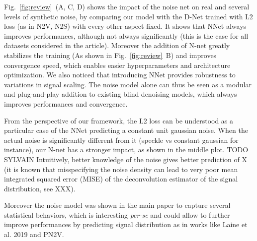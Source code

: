 \documentclass{article}
\begin{document}
Fig.~\ref{fig:review}~(A, C, D) shows the impact of the noise net on real and several levels of synthetic noise, by comparing our model with the D-Net trained with L2 loss (as in N2V, N2S) with every other aspect fixed. It shows that NNet always improves performances, although not always significantly (this is the case for all datasets considered in the article). Moreover the addition of N-net greatly stabilizes the training (As shown in Fig.~\ref{fig:review}~B) and improves convergence speed, which enables easier hyperparameters and architecture optimization. We also noticed that introducing NNet provides robustness to variations in signal scaling. The noise model alone can thus be seen as a modular and plug-and-play addition to existing blind denoising models, which always improves performances and convergence.

From the perspective of our framework, the L2 loss can be understood as a particular case of the NNet predicting a constant unit gaussian noise. When the actual noise is significantly different from it (speckle vs constant gaussian for instance), our N-net has a stronger impact, as shown in the middle plot.
TODO SYLVAIN  Intuitively, better knowledge of the noise gives better prediction of X (it is known that misspecifying the noise density can lead to very poor mean integrated squared error (MISE) of the deconvolution estimator of the signal distribution, see XXX).

Moreover the noise model was shown in the main paper to capture several statistical behaviors, which is interesting \textit{per-se} and could allow to further improve performances by predicting signal distribution as in works like Laine et al. 2019 and PN2V.
\end{document}
